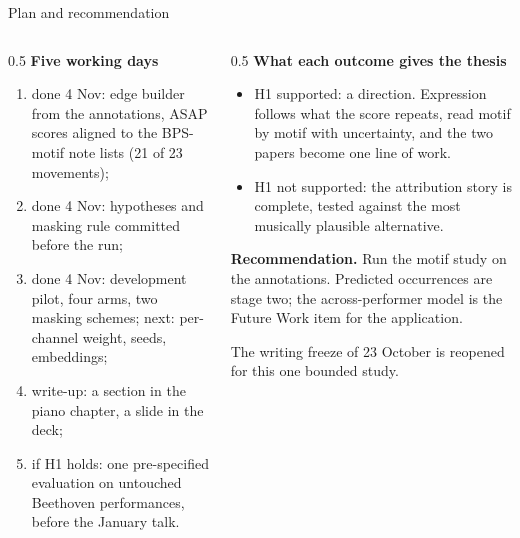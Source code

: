 \documentclass[aspectratio=169,11pt]{beamer}
\begin{document}
\begin{frame}{Plan and recommendation}
  \small
  \begin{columns}[T]
    \begin{column}{0.5\textwidth}
      \textbf{Five working days}
      \begin{enumerate}
        \item \textcolor{muted}{done 4 Nov:} edge builder from the annotations, ASAP
          scores aligned to the BPS-motif note lists (21 of 23 movements);
        \item \textcolor{muted}{done 4 Nov:} hypotheses and masking rule committed before the run;
        \item \textcolor{muted}{done 4 Nov:} development pilot, four arms, two
          masking schemes; next: per-channel weight, seeds, embeddings;
        \item write-up: a section in the piano chapter, a slide in the deck;
        \item if H1 holds: one pre-specified evaluation on untouched
          Beethoven performances, before the January talk.
      \end{enumerate}
    \end{column}
    \begin{column}{0.5\textwidth}
      \textbf{What each outcome gives the thesis}
      \begin{itemize}
        \item H1 supported: a direction. Expression follows what the score
          repeats, read motif by motif with uncertainty, and the two
          papers become one line of work.
        \item H1 not supported: the attribution story is complete, tested
          against the most musically plausible alternative.
      \end{itemize}
      \vspace{2mm}
      \textbf{Recommendation.} Run the motif study on the annotations.
      Predicted occurrences are stage two; the across-performer model is
      the Future Work item for the application.
      \vspace{2mm}

      \textcolor{muted}{\small The writing freeze of 23 October is reopened
      for this one bounded study.}
    \end{column}
  \end{columns}
\end{frame}
\end{document}
